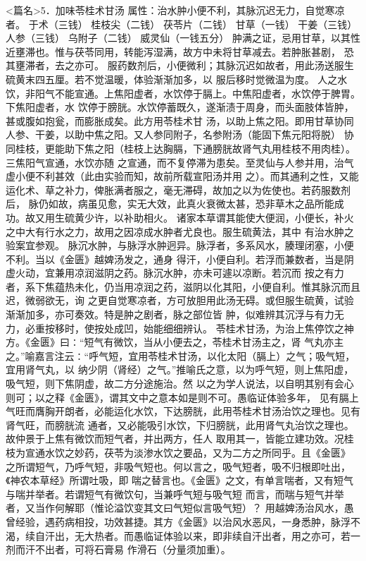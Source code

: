 \documentclass[a4paper,12pt,UTF8,twoside]{ctexbook}
\begin{document}
<篇名>5．加味苓桂术甘汤
属性：治水肿小便不利，其脉沉迟无力，自觉寒凉者。 
于术（三钱） 桂枝尖（二钱） 茯苓片（二钱） 甘草（一钱） 干姜（三钱） 人参（三钱） 乌附子（二钱） 
威灵仙（一钱五分） 
肿满之证，忌用甘草，以其性近壅滞也。惟与茯苓同用，转能泻湿满，故方中未将甘草减去。若肿胀甚剧， 
恐其壅滞者，去之亦可。 
服药数剂后，小便微利；其脉沉迟如故者，用此汤送服生硫黄末四五厘。若不觉温暖，体验渐渐加多，以 
服后移时觉微温为度。 
人之水饮，非阳气不能宣通。上焦阳虚者，水饮停于膈上。中焦阳虚者，水饮停于脾胃。下焦阳虚者，水 
饮停于膀胱。水饮停蓄既久，遂渐渍于周身，而头面肢体皆肿，甚或腹如抱瓮，而膨胀成矣。此方用苓桂术甘 
汤，以助上焦之阳。即用甘草协同人参、干姜，以助中焦之阳。又人参同附子，名参附汤（能固下焦元阳将脱） 
协同桂枝，更能助下焦之阳（桂枝上达胸膈，下通膀胱故肾气丸用桂枝不用肉桂）。三焦阳气宣通，水饮亦随 
之宣通，而不复停滞为患矣。至灵仙与人参并用，治气虚小便不利甚效（此由实验而知，故前所载宣阳汤并用 
之）。而其通利之性，又能运化术、草之补力，俾胀满者服之，毫无滞碍，故加之以为佐使也。若药服数剂后， 
脉仍如故，病虽见愈，实无大效，此真火衰微太甚，恐非草木之品所能成功。故又用生硫黄少许，以补助相火。 
诸家本草谓其能使大便润，小便长，补火之中大有行水之力，故用之因凉成水肿者尤良也。服生硫黄法，其中 
有治水肿之验案宜参观。 
脉沉水肿，与脉浮水肿迥异。脉浮者，多系风水，腠理闭塞，小便不利。当以《金匮》越婢汤发之，通身 
得汗，小便自利。若浮而兼数者，当是阴虚火动，宜兼用凉润滋阴之药。脉沉水肿，亦未可遽以凉断。若沉而 
按之有力者，系下焦蕴热未化，仍当用凉润之药，滋阴以化其阳，小便自利。惟其脉沉而且迟，微弱欲无，询 
之更自觉寒凉者，方可放胆用此汤无碍。或但服生硫黄，试验渐渐加多，亦可奏效。特是肿之剧者，脉之部位皆 
肿，似难辨其沉浮与有力无力，必重按移时，使按处成凹，始能细细辨认。 
苓桂术甘汤，为治上焦停饮之神方。《金匮》曰∶“短气有微饮，当从小便去之，苓桂术甘汤主之，肾 
气丸亦主之。”喻嘉言注云∶“呼气短，宜用苓桂术甘汤，以化太阳（膈上）之气；吸气短，宜用肾气丸，以 
纳少阴（肾经）之气。”推喻氏之意，以为呼气短，则上焦阳虚，吸气短，则下焦阴虚，故二方分途施治。然 
以之为学人说法，以自明其别有会心则可；以之释《金匮》，谓其文中之意本如是则不可。愚临证体验多年， 
见有膈上气旺而膺胸开朗者，必能运化水饮，下达膀胱，此用苓桂术甘汤治饮之理也。见有肾气旺，而膀胱流 
通者，又必能吸引水饮，下归膀胱，此用肾气丸治饮之理也。故仲景于上焦有微饮而短气者，并出两方，任人 
取用其一，皆能立建功效。况桂枝为宣通水饮之妙药，茯苓为淡渗水饮之要品，又为二方之所同乎。且《金匮》 
之所谓短气，乃呼气短，非吸气短也。何以言之，吸气短者，吸不归根即吐出，《神农本草经》所谓吐吸，即 
喘之替言也。《金匮》之文，有单言喘者，又有短气与喘并举者。若谓短气有微饮句，当兼呼气短与吸气短 
而言，而喘与短气并举者，又当作何解耶（惟论溢饮变其文曰气短似言吸气短）？ 
用越婢汤治风水，愚曾经验，遇药病相投，功效甚捷。其方《金匮》以治风水恶风，一身悉肿，脉浮不 
渴，续自汗出，无大热者。而愚临证体验以来，即非续自汗出者，用之亦可，若一剂而汗不出者，可将石膏易 
作滑石（分量须加重）。 
\end{document}
